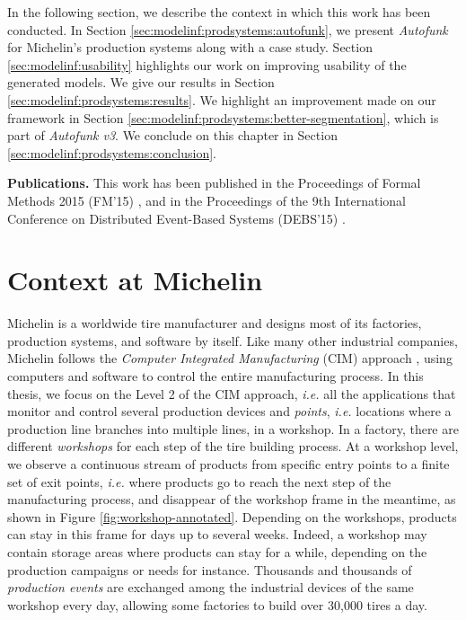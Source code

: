 In the following section, we describe the context in which this
work has been conducted. In Section
\ref{sec:modelinf:prodsystems:autofunk}, we present
\textit{Autofunk} for Michelin's production systems along with a
case study. Section \ref{sec:modelinf:usability} highlights our
work on improving usability of the generated models.  We give our
results in Section \ref{sec:modelinf:prodsystems:results}. We
highlight an improvement made on our framework in Section
\ref{sec:modelinf:prodsystems:better-segmentation}, which is
part of \emph{Autofunk v3}. We conclude on this chapter in
Section \ref{sec:modelinf:prodsystems:conclusion}.

\textbf{Publications.} This work has been published in the
Proceedings of Formal Methods 2015 (FM'15)
\cite{DBLP:conf/fm/DurandS15}, and in the Proceedings of the 9th
International Conference on Distributed Event-Based Systems
(DEBS'15) \cite{DBLP:conf/debs/SalvaD15}.

\section{Context at Michelin}
\label{prodsys:context}

Michelin is a worldwide tire manufacturer and designs most of its
factories, production systems, and software by itself.  Like
many other industrial companies, Michelin follows the \emph{Computer
Integrated Manufacturing} (CIM) approach \cite{rehg2004computer},
using computers and software to control the entire manufacturing
process. In this thesis, we focus on the Level 2 of the CIM
approach, \emph{i.e.} all the applications that monitor and control
several production devices and \emph{points}, \emph{i.e.}
locations where a production line branches into multiple lines,
in a workshop. In a factory, there are different \emph{workshops}
for each step of the tire building process. At a workshop level,
we observe a continuous stream of products from specific entry
points to a finite set of exit points, \emph{i.e.} where products
go to reach the next step of the manufacturing process, and
disappear of the workshop frame in the meantime, as shown in
Figure \ref{fig:workshop-annotated}.  Depending on the workshops,
products can stay in this frame for days up to several weeks.
Indeed, a workshop may contain storage areas where products can
stay for a while, depending on the production campaigns or needs
for instance.  Thousands and thousands of \emph{production
events} are exchanged among the industrial devices of the same
workshop every day, allowing some factories to build over 30,000
tires a day.

